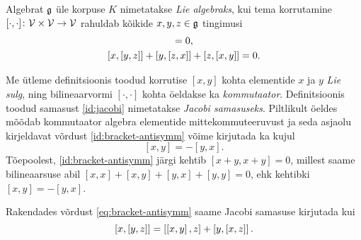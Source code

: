 \begin{dfn}\label{def:lie-algebra}
    Algebrat $\mathfrak{g}$ üle korpuse $K$ nimetatakse \emph{Lie algebraks}, kui
    tema korrutamine $[\cdot, \cdot] \colon \mathcal{V} \times \mathcal{V} \to \mathcal{V}$ rahuldab
    kõikide $x, y, z \in \mathfrak{g}$ tingimusi
    \begin{gather}
        [x, x] = 0,\label{id:bracket-antisymm} \\
        \brac{x}{\brac{y}{z}} + \brac{y}{\brac{z}{x}} +
            \brac{z}{\brac{x}{y}} = 0.\label{id:jacobi}
    \end{gather}
\end{dfn}

Me ütleme definitsioonis toodud korrutise $[x, y]$ kohta elementide $x$ ja
$y$ \emph{Lie sulg}, ning bilineaarvormi $[\cdot, \cdot]$ kohta öeldakse ka
\emph{kommutaator}. Definitsioonis toodud samasust \eqref{id:jacobi}
nimetatakse \emph{Jacobi samasuseks}. Piltlikult öeldes mõõdab kommutaator
algebra elementide mittekommuteeruvust ja seda asjaolu kirjeldavat võrdust
\eqref{id:bracket-antisymm} võime kirjutada ka kujul
\begin{equation}\label{eq:bracket-antisymm}
    [x, y] = -[y, x].
\end{equation}
Tõepoolest, \eqref{id:bracket-antisymm} järgi kehtib $[x+y, x+y] = 0$,
millest saame bilineaarsuse abil $[x, x] + [x, y] + [y, x] + [y, y] = 0$,
ehk kehtibki $[x, y] = -[y, x]$.

Rakendades võrdust \eqref{eq:bracket-antisymm} saame Jacobi samasuse
kirjutada kui
\begin{equation}
    \left[ x, \left[ y, z \right] \right] = \left[ \left[ x, y \right], z \right] + \left[ y, \left[ x, z \right] \right].
\end{equation}

